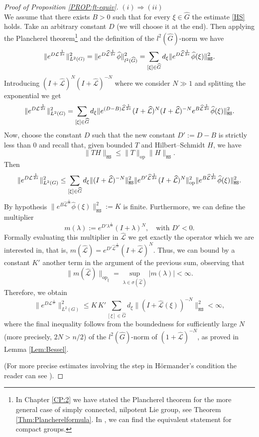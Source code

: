 \documentclass[12pt,oneside,a4paper]{book}
\numberwithin{equation}{section}     %
\theoremstyle{plain}
\theoremstyle{definition}
\DeclareMathOperator{\OP}{op}
\newcommand{\slp}{{\mathcal L}}
\newcommand{\HS}{{\mathtt{HS}}}
\newcommand{\Gh}{{\widehat{G}}}
\begin{document}
\begin{proof}[Proof of Proposition \ref{PROP:ft-equiv}]
	$(i)\Rightarrow (ii)$ \\
	We assume that there exists $B>0$ such that for every $\xi\in\widehat G$ the estimate \eqref{HS} holds. Take an arbitrary constant $D$ (we will choose it at the end). Then applying the Plancherel theorem\footnote{In Chapter \ref{CP:2} we have stated the Plancherel theorem for the more general case of simply connected, nilpotent Lie group, see Theorem \ref{Thm:Plancherelformula}. In \cite[Corollary 7.6.7]{RT2009}, we can find the equivalent statement for compact groups.} and the definition of the $l^2(\widehat G)$-norm we have
	\begin{align}\notag
	\|e^{D\slp^{\frac{1}{2s}}}\|^2_{L^2(G)}=\|e^{D\widehat\slp^{\frac{1}{2s}}}\widehat\phi\|^2_{l^2(\widehat G)}=\sum_{[\xi]\in\widehat G} d_\xi\|e^{D\widehat\slp^{\frac{1}{2s}}} \widehat{ \phi}(\xi)\|^2_{\HS}.
	\end{align} 
	Introducing $(I+\widehat\slp)^N(I+\widehat\slp)^{-N}$ where we consider $N\gg 1$ and splitting the exponential we get
	\begin{align}\notag
	\|e^{D\slp^{\frac{1}{2s}}}\|^2_{L^2(G)}=\sum_{[\xi]\in\widehat G} d_\xi\|e^{(D-B)\widehat\slp^{\frac{1}{2s}}}(I+\widehat\slp)^N(I+\widehat\slp)^{-N}e^{B\widehat\slp^{\frac{1}{2s}}}\widehat \phi(\xi)\|^2_{\HS}.
	\end{align}
	Now, choose the constant $D$ such that the new constant $D':=D-B$ is strictly less than 0 and recall that, given bounded $T$ and Hilbert--Schmidt $H$, we have
	\[
	\|TH\|_{\HS}\leq \|T\|_{\OP}\|H\|_{\HS}.
	\]
	Then
	\begin{align}\notag
	\|e^{D\slp^{\frac{1}{2s}}}\|^2_{L^2(G)}\leq\sum_{[\xi]\in\widehat G}d_\xi\|(I+\widehat\slp)^{-N}\|^2_{\HS}\|e^{D'\widehat\slp^{\frac{1}{2s}}}(I+\widehat\slp)^N\|^2_{\OP}\|e^{B\widehat\slp^{\frac{1}{2s}}}\widehat\phi(\xi)\|^2_{\HS}.\end{align}
	By hypothesis $\|e^{B\widehat\slp^{\frac{1}{2s}}}\widehat\phi(\xi)\|^2_{\HS}:= K$ is finite. Furthermore, we can define the multiplier
	\[
	m(\lambda):=e^{D'\lambda^{\frac{1}{2s}}}(I+\lambda)^N,\quad\text{with }D'<0.
	\]
	Formally evaluating this multiplier in $\widehat\slp$ we get exactly the operator which we are interested in, that is, $m(\widehat\slp)=e^{D'\widehat\slp^{\frac{1}{2s}}}(I+\widehat\slp)^N$. Thus, we can bound by a constant $K'$ another term in the argument of the previous sum, observing that
	\[
	\|m(\widehat\slp)\|_{\OP_\xi}=\sup_{\lambda\in\sigma(\widehat\slp)}|m(\lambda)|<\infty.
	\]
	Therefore, we obtain
	\[
	\|e^{D\slp^{\frac{1}{2s}}}\|^2_{L^2(G)}\leq K\,K'\sum_{[\xi]\in\widehat G}d_\xi\|(I+\widehat\slp(\xi))^{-N}\|^2_{\HS}<\infty,
	\]
	where the final inequality follows from the boundedness for sufficiently large $N$ (more precisely, $2N>n/2$) of the $l^2(\Gh)$-norm of $(1+\widehat{\slp})^{-N}$, as proved in Lemma \ref{Lem:Bessel}.
	
	(For more precise estimates involving the step in H\"ormander's condition the reader can see \cite[Proposition 3.1]{GR2015}). 
\end{proof}
\end{document}
